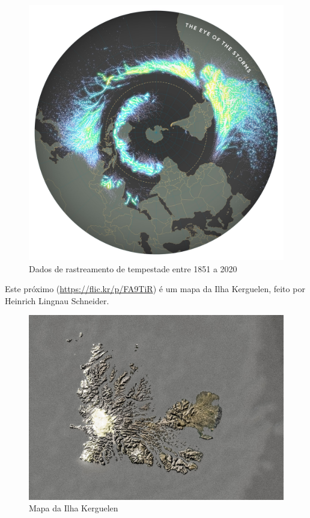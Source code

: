 \documentclass[
]{book}
\begin{document}
\begin{figure}
\centering
\includegraphics{media/modulo1/sample-2.jpg}
\caption{Dados de rastreamento de tempestade entre 1851 a 2020}
\end{figure}

Este próximo (\url{https://flic.kr/p/FA9TiR}) é um mapa da Ilha Kerguelen, feito por Heinrich Lingnau Schneider.

\begin{figure}
\centering
\includegraphics{media/modulo1/sample-3.jpg}
\caption{Mapa da Ilha Kerguelen}
\end{figure}
\end{document}
